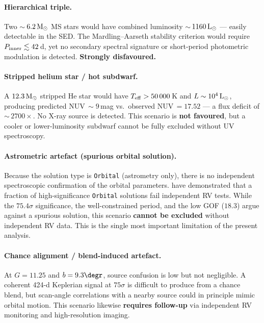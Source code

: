 \documentclass[usenatbib,fleqn]{mnras}
\newcommand{\Msun}{{\rm M}_\odot}
\newcommand{\Lsun}{{\rm L}_\odot}
\begin{document}
\paragraph{Hierarchical triple.}
Two $\sim$\,$6.2\,\Msun$ MS stars would have combined luminosity
$\sim$\,$1160\,\Lsun$ --- easily detectable in the SED.  The
Mardling--Aarseth stability criterion \citep{MardlingAarseth2001}
would require $P_{\rm inner} \lesssim 42$\,d, yet no secondary
spectral signature or short-period photometric modulation is
detected.  \textbf{Strongly disfavoured.}

\paragraph{Stripped helium star / hot subdwarf.}
A $12.3\,\Msun$ stripped He star would have
$T_{\rm eff} > 50\,000$\,K and $L \sim 10^4\,\Lsun$, producing
predicted NUV$\,\sim 9$\,mag vs.\ observed
NUV$\,= 17.52$ --- a flux deficit of $\sim$\,$2700\times$.
No X-ray source is detected.  This scenario is
\textbf{not favoured}, but a cooler or lower-luminosity subdwarf
cannot be fully excluded without UV spectroscopy.

\paragraph{Astrometric artefact (spurious orbital solution).}
Because the solution type is \texttt{Orbital} (astrometry only),
there is no independent spectroscopic confirmation of the orbital
parameters.  \citet{ElBadry2024} have demonstrated that a
fraction of high-significance \texttt{Orbital} solutions fail
independent RV tests.  While the $75.4\sigma$ significance, the
well-constrained period, and the low GOF ($18.3$) argue against
a spurious solution, this scenario \textbf{cannot be excluded}
without independent RV data.  This is the single most important
limitation of the present analysis.

\paragraph{Chance alignment / blend-induced artefact.}
At $G = 11.25$ and $b = 9.3\degr$, source confusion is low but
not negligible.  A coherent 424-d Keplerian signal at $75\sigma$
is difficult to produce from a chance blend, but scan-angle
correlations with a nearby source could in principle mimic orbital
motion.  This scenario likewise \textbf{requires follow-up}
via independent RV monitoring and high-resolution imaging.
\end{document}
